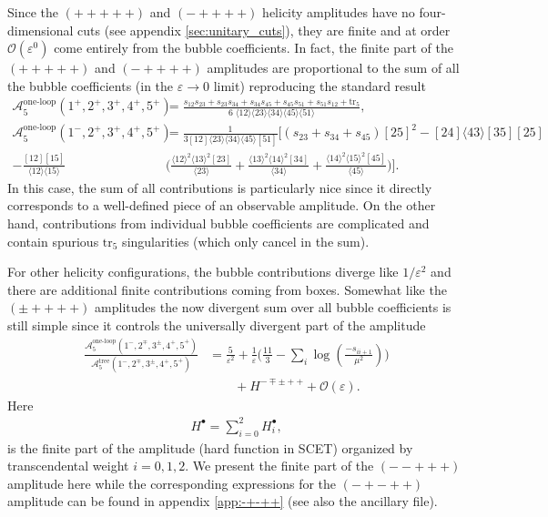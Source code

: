 \documentclass[11pt]{article}
\newcommand{\nn}{\nonumber}
\newcommand{\la}{\langle}
\newcommand{\ra}{\rangle}
\newcommand{\trfive}{{\text{tr}_5}}
\renewcommand{\O}{\mathcal{O}}
\newcommand{\A}{\mathcal{A}}
\newcommand{\vep}{\varepsilon}
\begin{document}
Since the $(+++++)$ and $(-++++)$ helicity amplitudes have no four-dimensional cuts (see  appendix \ref{sec:unitary_cuts}), they are finite and at order $\O(\vep^0)$ come entirely from the bubble coefficients. 
In fact, the finite part of the $(+++++)$ and $(-++++)$ amplitudes are proportional to the sum of all the bubble coefficients (in the $\vep\to0$ limit) reproducing the standard result \cite{Bern:1993mq}
\begin{align}
	\A^{\text{one-loop}}_{5}(1^+,2^+,3^+,4^+,5^+)
	&= \frac{s_{12}s_{23}+s_{23}s_{34}+s_{34}s_{45}+s_{45}s_{51}+s_{51}s_{12}+\trfive}{6\; \la12\ra\la23\ra\la34\ra\la45\ra\la51\ra},
	\\
	\A^{\text{one-loop}}_{5}(1^-,2^+,3^+,4^+,5^+)
	&= \frac{1}{3 [12]\la23\ra\la34\ra\la45\ra[51]}
	\bigg[ 
		(s_{23}{+}s_{34}{+}s_{45})[25]^2
		{-} [24]\la43\ra[35][25]
	\nn\\
		{-} \frac{[12][15]}{\la12\ra\la15\ra}
		&
			\bigg(
				 \frac{\la12\ra^2 \la13\ra^2[23]}{\la23\ra}
				{+} \frac{\la13\ra^2 \la14\ra^2[34]}{\la34\ra}
				{+} \frac{\la14\ra^2 \la15\ra^2[45]}{\la45\ra}
			\bigg)
	\bigg].
\end{align}
In this case, the sum of all contributions is particularly nice since it directly corresponds to a well-defined piece of an observable amplitude. On the other hand, contributions from individual bubble coefficients are complicated and contain spurious $\trfive$ singularities (which only cancel in the sum).


For other helicity configurations, the bubble contributions diverge like $1/\vep^2$ and there are additional finite contributions coming from boxes.
Somewhat like the $(\pm++++)$ amplitudes the now divergent sum over all bubble coefficients is still simple since it controls the universally divergent part of the amplitude 
\begin{align}
	\frac{\A_{5}^\text{one-loop}(1^-,2^\mp,3^\pm,4^+,5^+)}{\A_{5}^\text{tree}(1^-,2^\mp,3^\pm,4^+,5^+)}
	&=\frac{5}{\vep^2} 
		+ \frac{1}{\vep}
		\bigg( 
			\frac{11}{3}
			- \sum_{i} \log\left(\frac{-s_{ii+1}}{\mu^2}\right)
		\bigg)
		\nn\\& \qquad
		+ H^{-\mp\pm++}
	 + \mathcal{O}(\vep).
\end{align}
Here
\begin{align}
	H^{\bullet} = \sum_{i=0}^2 H^{\bullet}_i,
\end{align}
is the finite part of the amplitude (hard function in SCET) organized by transcendental weight $i=0,1,2$.
We present the finite part of the $(--+++)$ amplitude here while the corresponding expressions for the $(-+-++)$ amplitude can be found in appendix \ref{app:-+-++} (see also the ancillary file).
\end{document}
